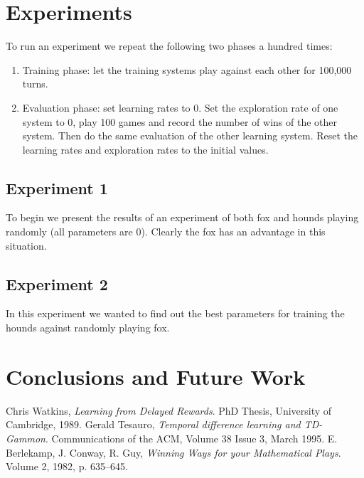 \documentclass[a4paper]{article}
\begin{document}
\section{Experiments}
To run an experiment we repeat the following two phases a hundred times:
\begin{enumerate}
    \item Training phase: let the training systems play against each other for
        100,000 turns.
    \item Evaluation phase: set learning rates to 0. Set the exploration
        rate of one system to 0, play 100 games and record the number of wins
        of the other system. Then do the same evaluation of the other learning
        system. Reset the learning rates and exploration rates to the initial
        values.
\end{enumerate}

\subsection{Experiment 1}
To begin we present the results of an experiment of both fox and hounds playing
randomly (all parameters are 0). Clearly the fox has an advantage in this
situation.



\subsection{Experiment 2}
In this experiment we wanted to find out the best parameters for training the
hounds against randomly playing fox.





\section{Conclusions and Future Work}

\begin{thebibliography}{9}
    Chris Watkins,
    {\em Learning from Delayed Rewards}.
    PhD Thesis, University of Cambridge, 1989.
    Gerald Tesauro,
    {\em Temporal difference learning and TD-Gammon}.
    Communications of the ACM,
    Volume 38 Issue 3, March 1995.
    E. Berlekamp, J. Conway, R. Guy,
    {\em Winning Ways for your Mathematical Plays}.
    Volume 2, 1982, p. 635--645.
\end{thebibliography}
\end{document}
